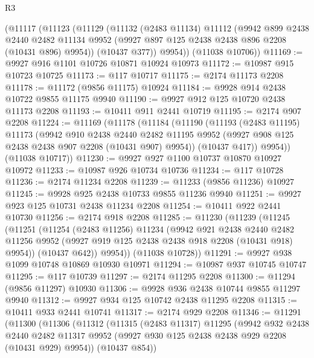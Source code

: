 \begin{lexlean}{R3}
\begin{coremodule}
    (@11117
      (@11123
        (@11129
          (@11132
            (@2483 @11134)
            @11112
            (@9942
              @899
              @2438
              @2440
              @2482
              @11134
              @9952
              (@9927 @897 @125 @2438 @2438 @896 @2208 (@10431 @896) @9954))
            (@10437 @377))
          @9954))
      (@11038 @10706))
@11169 := @9927 @916 @1101 @10726 @10871 @10924 @10973
@11172 := @10987 @915 @10723 @10725
@11173 := @117 @10717
@11175 := @2174 @11173 @2208
@11178 := @11172 (@9856 @11175) @10924
@11184 := @9928 @914 @2438 @10722 @9855 @11175 @9940
@11190 := @9927 @912 @125 @10720 @2438 @11173 @2208
@11193 := @10411 @911 @2441 @10719
@11195 := @2174 @907 @2208
@11224 := @11169
    (@11178
      (@11184
        (@11190
          (@11193
            (@2483 @11195)
            @11173
            (@9942
              @910
              @2438
              @2440
              @2482
              @11195
              @9952
              (@9927 @908 @125 @2438 @2438 @907 @2208 (@10431 @907) @9954))
            (@10437 @417))
          @9954))
      (@11038 @10717))
@11230 := @9927 @927 @1100 @10737 @10870 @10927 @10972
@11233 := @10987 @926 @10734 @10736
@11234 := @117 @10728
@11236 := @2174 @11234 @2208
@11239 := @11233 (@9856 @11236) @10927
@11245 := @9928 @925 @2438 @10733 @9855 @11236 @9940
@11251 := @9927 @923 @125 @10731 @2438 @11234 @2208
@11254 := @10411 @922 @2441 @10730
@11256 := @2174 @918 @2208
@11285 := @11230
    (@11239
      (@11245
        (@11251
          (@11254
            (@2483 @11256)
            @11234
            (@9942
              @921
              @2438
              @2440
              @2482
              @11256
              @9952
              (@9927 @919 @125 @2438 @2438 @918 @2208 (@10431 @918) @9954))
            (@10437 @642))
          @9954))
      (@11038 @10728))
@11291 := @9927 @938 @1099 @10748 @10869 @10930 @10971
@11294 := @10987 @937 @10745 @10747
@11295 := @117 @10739
@11297 := @2174 @11295 @2208
@11300 := @11294 (@9856 @11297) @10930
@11306 := @9928 @936 @2438 @10744 @9855 @11297 @9940
@11312 := @9927 @934 @125 @10742 @2438 @11295 @2208
@11315 := @10411 @933 @2441 @10741
@11317 := @2174 @929 @2208
@11346 := @11291
    (@11300
      (@11306
        (@11312
          (@11315
            (@2483 @11317)
            @11295
            (@9942
              @932
              @2438
              @2440
              @2482
              @11317
              @9952
              (@9927 @930 @125 @2438 @2438 @929 @2208 (@10431 @929) @9954))
            (@10437 @854))

\end{coremodule}
\end{lexlean}
